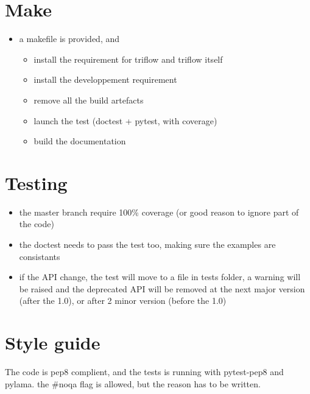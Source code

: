 \documentclass[letterpaper,10pt,english]{sphinxmanual}
\begin{document}
\section{Make}
\label{\detokenize{contribute:make}}\begin{itemize}
\item {} 
a makefile is provided, and
\begin{itemize}
\item {} 
 install the requirement for triflow and triflow itself

\item {} 
 install the developpement requirement

\item {} 
 remove all the build artefacts

\item {} 
 launch the test (doctest + pytest, with coverage)

\item {} 
 build the documentation

\end{itemize}

\end{itemize}


\section{Testing}
\label{\detokenize{contribute:testing}}\begin{itemize}
\item {} 
the master branch require 100\% coverage (or good reason to ignore part of the code)

\item {} 
the doctest needs to pass the test too, making sure the examples are consistants

\item {} 
if the API change, the test will move to a file  in tests folder, a warning will be raised and the deprecated API will be removed at the next major version (after the 1.0), or after 2 minor version (before the 1.0)

\end{itemize}


\section{Style guide}
\label{\detokenize{contribute:style-guide}}
The code is pep8 complient, and the tests is running with pytest-pep8 and pylama. the \#noqa flag is allowed, but the reason has to be written.
\end{document}
